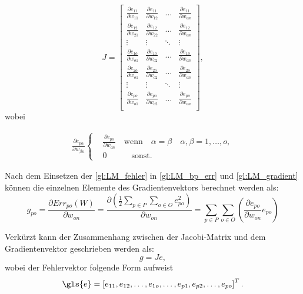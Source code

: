 \begin{equation}
J
=
 \begin{bmatrix}
    \frac{\partial e_{11}}{\partial w_{11}} & \frac{\partial e_{11}}{\partial w_{12}}  & \dots  & \frac{\partial e_{11}}{\partial w_{on}} \\
    \frac{\partial e_{12}}{\partial w_{21}} & \frac{\partial e_{12}}{\partial w_{22}}  & \dots  & \frac{\partial e_{12}}{\partial w_{on}} \\
    \vdots & \vdots & \ddots & \vdots \\
    \frac{\partial e_{1o}}{\partial w_{o1}} & \frac{\partial e_{1o}}{\partial w_{o2}}  & \dots  & \frac{\partial e_{1o}}{\partial w_{on}} \\
    \frac{\partial e_{2o}}{\partial w_{o1}} & \frac{\partial e_{2o}}{\partial w_{o2}}  & \dots  & \frac{\partial e_{2o}}{\partial w_{on}} \\
    \vdots & \vdots & \ddots & \vdots \\
    \frac{\partial e_{po}}{\partial w_{o1}} & \frac{\partial e_{po}}{\partial w_{o2}}  & \dots  & \frac{\partial e_{po}}{\partial w_{on}} \\
 \end{bmatrix}
,
\end{equation}
wobei

\begin{align}
 \frac{\partial e_{p \alpha}}{\partial w_{\beta n}}
\left \{
\begin{aligned}
& \frac{\partial e_{p o}}{\partial w_{o n}} \quad \text{wenn} \quad \alpha=\beta \quad \alpha,\beta=1,\dots,o, \\
& 0 \quad \qquad \text{sonst}.
\end{aligned}
\right.
\label{gl:LM_fuellen}
\end{align}


Nach dem Einsetzen der \autoref{gl:LM_fehler} in \autoref{gl:LM_bp_err} und \autoref{gl:LM_gradient} können die einzelnen Elemente des Gradientenvektors berechnet werden als:
\begin{equation}
g_{po} = \frac{\partial Err_{po}(W)}{\partial w_{on}} = \frac{\partial \left (\frac{1}{2} \sum_{p \in P} \sum_{o \in O} e_{po}^2 \right )}{\partial w_{on}} 
=
\sum_{p \in P} \sum_{o \in O} \left ( \frac{\partial e_{po}}{\partial w_{on}} e_{po} \right )
\label{gl:LM_g-J}
\end{equation}

Verkürzt kann der Zusammenhang zwischen der Jacobi-Matrix und dem Gradientenvektor geschrieben werden als:
\begin{equation}
g = Je,
\label{gl:LM_Je}
\end{equation}
wobei der Fehlervektor folgende Form aufweist
\begin{equation}
\gls{e}= \left [ e_{11}, e_{12}, \dots, e_{1o}, \dots, e_{p1}, e_{p2}, \dots, e_{po} \right ]^T.
\label{gl:LM_bp}
\end{equation}

